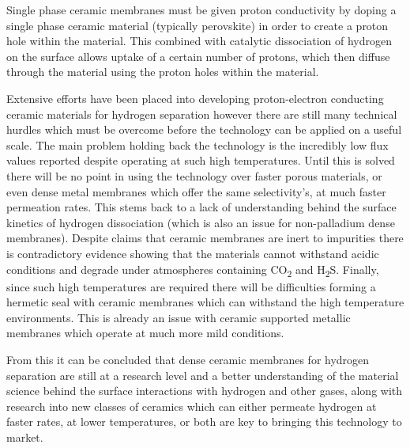 Single phase ceramic membranes must be given proton conductivity by doping a single phase 
ceramic material (typically perovskite) in order to create a proton hole within the material. 
This combined with catalytic dissociation of hydrogen  on the surface allows uptake of a 
certain number of protons, which then diffuse through the material using the proton holes 
within the material. \cite{Tao2015, Phair2006}

Extensive efforts have been placed into developing proton-electron conducting ceramic 
materials for hydrogen separation however there are still many technical hurdles which must 
be overcome before the technology can be applied on a useful scale. The main problem holding 
back the technology is the incredibly low flux values reported despite operating at such high 
temperatures. Until this is solved there will be no point in using the technology over 
faster porous materials, or even dense metal membranes which offer the same selectivity’s, 
at much faster permeation rates. This stems back to a lack of understanding behind the 
surface kinetics of hydrogen dissociation (which is also an issue for non-palladium dense 
membranes). Despite claims that ceramic membranes are inert to impurities there is 
contradictory evidence showing that the materials cannot withstand acidic conditions and 
degrade under atmospheres containing CO\textsubscript{2} and H\textsubscript{2}S. 
Finally, since such high temperatures are 
required there will be difficulties forming a hermetic seal with ceramic membranes which can 
withstand the high temperature environments. This is already an issue with ceramic supported 
metallic membranes which operate at much more mild conditions. 

From this it can be concluded that dense ceramic membranes for hydrogen separation are still 
at a research level and a better understanding of the material science behind the surface 
interactions with hydrogen and other gases, along with research into new classes of ceramics 
which can either permeate hydrogen at faster rates, at lower temperatures, or both are key 
to bringing this technology to market. 


\eject \pdfpagewidth=16.5in \pdfpageheight=11.7in


